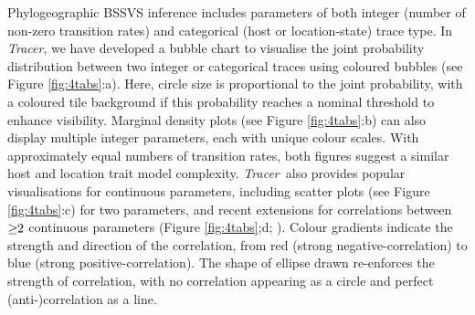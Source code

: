 \documentclass{bioinfo}
\newcommand{\tracer}{\emph{Tracer}}
\begin{document}
Phylogeographic BSSVS inference includes parameters of both integer (number of non-zero transition rates) and categorical (host or location-state) trace type.
In \tracer, we have developed a bubble chart to visualise the joint probability distribution between two integer or categorical traces using coloured bubbles (see Figure \ref{fig:4tabs}:a).
Here, circle size is proportional to the joint probability, %
with a coloured tile background if this probability reaches a nominal threshold to enhance visibility.
Marginal density plots (see Figure \ref{fig:4tabs}:b) can also display multiple integer parameters, each with unique colour scales.
With approximately equal numbers of transition rates, both figures suggest a similar host and location trait model complexity.
\tracer\ also provides
 popular visualisations for continuous parameters, including scatter plots (see Figure \ref{fig:4tabs}:c) for two parameters,
 and recent extensions for correlations between $\ge\hspace{-0.32em}2$ continuous parameters (Figure \ref{fig:4tabs};d; \citet{Murdoch}).
Colour gradients indicate the strength and direction of the correlation, from red (strong negative-correlation) to blue (strong positive-correlation).
The shape of ellipse drawn re-enforces the strength of correlation, with no correlation appearing as a circle and perfect (anti-)correlation as a line.
\end{document}
